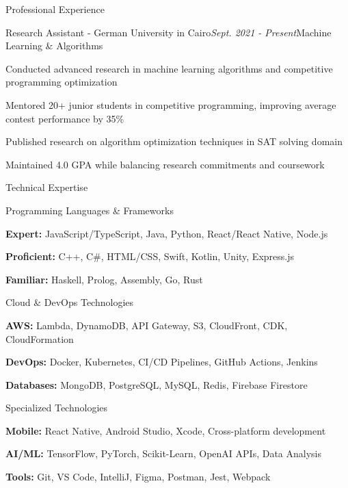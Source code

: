 \documentclass{resume}
\begin{document}
\begin{rSection}{Professional Experience}
\begin{rSubsection}{Research Assistant - German University in Cairo}{\em Sept. 2021 - Present}{Machine Learning \& Algorithms}{}
\item Conducted advanced research in machine learning algorithms and competitive programming optimization
\item Mentored 20+ junior students in competitive programming, improving average contest performance by 35\%
\item Published research on algorithm optimization techniques in SAT solving domain
\item Maintained 4.0 GPA while balancing research commitments and coursework
\end{rSubsection}

\end{rSection}


\begin{rSection}{Technical Expertise}

\begin{rSubsection}{Programming Languages \& Frameworks}{}{}{}
\item {\bf Expert:} JavaScript/TypeScript, Java, Python, React/React Native, Node.js
\item {\bf Proficient:} C++, C\#, HTML/CSS, Swift, Kotlin, Unity, Express.js
\item {\bf Familiar:} Haskell, Prolog, Assembly, Go, Rust
\end{rSubsection}

\begin{rSubsection}{Cloud \& DevOps Technologies}{}{}{}
\item {\bf AWS:} Lambda, DynamoDB, API Gateway, S3, CloudFront, CDK, CloudFormation
\item {\bf DevOps:} Docker, Kubernetes, CI/CD Pipelines, GitHub Actions, Jenkins
\item {\bf Databases:} MongoDB, PostgreSQL, MySQL, Redis, Firebase Firestore
\end{rSubsection}

\begin{rSubsection}{Specialized Technologies}{}{}{}
\item {\bf Mobile:} React Native, Android Studio, Xcode, Cross-platform development
\item {\bf AI/ML:} TensorFlow, PyTorch, Scikit-Learn, OpenAI APIs, Data Analysis
\item {\bf Tools:} Git, VS Code, IntelliJ, Figma, Postman, Jest, Webpack
\end{rSubsection}

\end{rSection}
\end{document}
